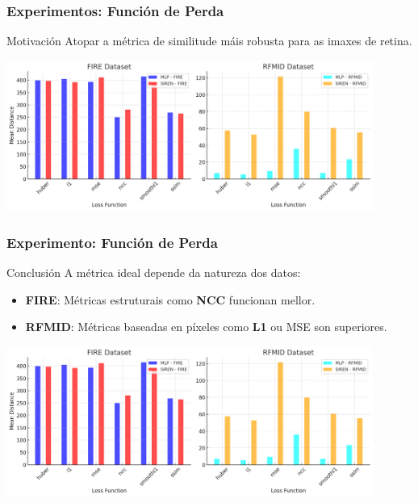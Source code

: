 \documentclass[xcolor=dvipsnames]{beamer}
\begin{document}
\begin{frame}
    \frametitle{Experimentos: Función de Perda}
    
    \begin{block}{Motivación}
        Atopar a métrica de similitude máis robusta para as imaxes de retina.
    \end{block}
    
    \begin{center}
        \includegraphics[width=0.9\textwidth]{../imaxes/losstype.png}
    \end{center}
    
\end{frame}

\begin{frame}
    \frametitle{Experimento: Función de Perda}
    \begin{alertblock}{Conclusión}
        A métrica ideal depende da natureza dos datos:
        \begin{itemize}
            \item \textbf{FIRE}: Métricas estruturais como \textbf{NCC} funcionan mellor.
            \item \textbf{RFMID}: Métricas baseadas en píxeles como \textbf{L1} ou MSE son superiores.
        \end{itemize}
    \end{alertblock}   
    \begin{center}
        \includegraphics[width=0.9\textwidth]{../imaxes/losstype.png}
    \end{center}
    
\end{frame}
\end{document}
